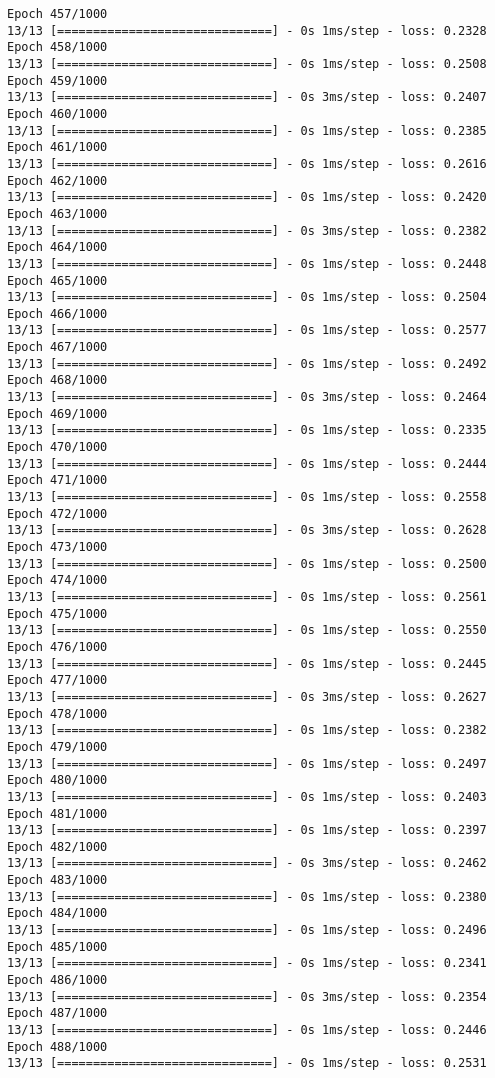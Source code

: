 \documentclass[11pt]{article}
\begin{document}
\begin{Verbatim}[commandchars=\\\{\}]
Epoch 457/1000
13/13 [==============================] - 0s 1ms/step - loss: 0.2328
Epoch 458/1000
13/13 [==============================] - 0s 1ms/step - loss: 0.2508
Epoch 459/1000
13/13 [==============================] - 0s 3ms/step - loss: 0.2407
Epoch 460/1000
13/13 [==============================] - 0s 1ms/step - loss: 0.2385
Epoch 461/1000
13/13 [==============================] - 0s 1ms/step - loss: 0.2616
Epoch 462/1000
13/13 [==============================] - 0s 1ms/step - loss: 0.2420
Epoch 463/1000
13/13 [==============================] - 0s 3ms/step - loss: 0.2382
Epoch 464/1000
13/13 [==============================] - 0s 1ms/step - loss: 0.2448
Epoch 465/1000
13/13 [==============================] - 0s 1ms/step - loss: 0.2504
Epoch 466/1000
13/13 [==============================] - 0s 1ms/step - loss: 0.2577
Epoch 467/1000
13/13 [==============================] - 0s 1ms/step - loss: 0.2492
Epoch 468/1000
13/13 [==============================] - 0s 3ms/step - loss: 0.2464
Epoch 469/1000
13/13 [==============================] - 0s 1ms/step - loss: 0.2335
Epoch 470/1000
13/13 [==============================] - 0s 1ms/step - loss: 0.2444
Epoch 471/1000
13/13 [==============================] - 0s 1ms/step - loss: 0.2558
Epoch 472/1000
13/13 [==============================] - 0s 3ms/step - loss: 0.2628
Epoch 473/1000
13/13 [==============================] - 0s 1ms/step - loss: 0.2500
Epoch 474/1000
13/13 [==============================] - 0s 1ms/step - loss: 0.2561
Epoch 475/1000
13/13 [==============================] - 0s 1ms/step - loss: 0.2550
Epoch 476/1000
13/13 [==============================] - 0s 1ms/step - loss: 0.2445
Epoch 477/1000
13/13 [==============================] - 0s 3ms/step - loss: 0.2627
Epoch 478/1000
13/13 [==============================] - 0s 1ms/step - loss: 0.2382
Epoch 479/1000
13/13 [==============================] - 0s 1ms/step - loss: 0.2497
Epoch 480/1000
13/13 [==============================] - 0s 1ms/step - loss: 0.2403
Epoch 481/1000
13/13 [==============================] - 0s 1ms/step - loss: 0.2397
Epoch 482/1000
13/13 [==============================] - 0s 3ms/step - loss: 0.2462
Epoch 483/1000
13/13 [==============================] - 0s 1ms/step - loss: 0.2380
Epoch 484/1000
13/13 [==============================] - 0s 1ms/step - loss: 0.2496
Epoch 485/1000
13/13 [==============================] - 0s 1ms/step - loss: 0.2341
Epoch 486/1000
13/13 [==============================] - 0s 3ms/step - loss: 0.2354
Epoch 487/1000
13/13 [==============================] - 0s 1ms/step - loss: 0.2446
Epoch 488/1000
13/13 [==============================] - 0s 1ms/step - loss: 0.2531

\end{Verbatim}
\end{document}
